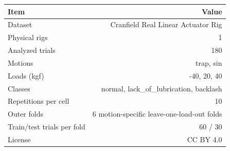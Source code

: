 \begin{tabular}{lr}
\hline
Item & Value \\
\hline
Dataset & Cranfield Real Linear Actuator Rig \\
Physical rigs & 1 \\
Analyzed trials & 180 \\
Motions & trap, sin \\
Loads (kgf) & -40, 20, 40 \\
Classes & normal, lack\_of\_lubrication, backlash \\
Repetitions per cell & 10 \\
Outer folds & 6 motion-specific leave-one-load-out folds \\
Train/test trials per fold & 60 / 30 \\
License & CC BY 4.0 \\
\hline
\end{tabular}
